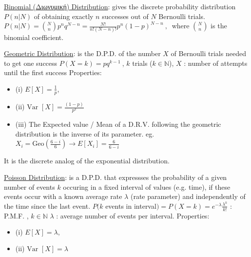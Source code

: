 \documentclass[12pt]{article}
\def\Var{\text{Var\ }} %
\begin{document}
\begin{flushleft}
	\uline{Binomial \textgreek{(Διωνυμική)} Distribution}: gives the discrete probability distribution $P(n|N)$ of obtaining exactly $n$ successes out of $N$ Bernoulli trials. \linebreak 
	$\displaystyle P(n|N) = \binom{N}{n} p^n q^{N-n} = \frac{N!}{n!(N-n)!} p^n (1-p)^{N-n} \ , \ $ where $\binom{N}{n}$ is the binomial coefficient. \linebreak 
	
	\uline{Geometric Distribution}: is the D.P.D. of the number $X$ of Bernoulli trials needed to get one success \linebreak 
	$P(X=k) = pq^{k-1}\ $, $k$ trials ($k\in \mathbb{N}$), $X$  :  number of attempts until the first success \linebreak 
	Properties: 
	\begin{itemize}
	\item (i) \quad $E[X] = \frac{1}{p}$, 
	\item (ii) \quad $\Var[X] = \frac{(1-p)}{p^2}$ 
	\item (iii) \quad The Expected value / Mean of a D.R.V. following the geometric distribution is the inverse of its parameter. eg. $\displaystyle X_i = \text{Geo}(\frac{6-i}{6}) \rightarrow E[X_i] = \frac{6}{6-i}$ 
	\end{itemize}
	It is the discrete analog of the exponential distribution. \linebreak 
	
	\uline{Poisson Distribution}: is a D.P.D. that expressses the probability of a given number of events $k$ occuring in a fixed interval of values (e.g. time), if these events occur with a known average rate $\lambda$ (rate parameter) and independently of the time since the last event. \linebreak 
	$P(k$ events in interval$) = P(X=k) = e^{-\lambda} \frac{\lambda^k}{k!} $  :  P.M.F. , $ k\in \mathbb{N} $ \linebreak 
	$\lambda$  :  average number of events per interval. \linebreak 
	Properties:  
	\begin{itemize}
	\item (i) \quad $E[X] = \lambda$, 
	\item (ii) \quad $\Var[X] = \lambda$  
	\end{itemize}


\end{flushleft}
\end{document}
